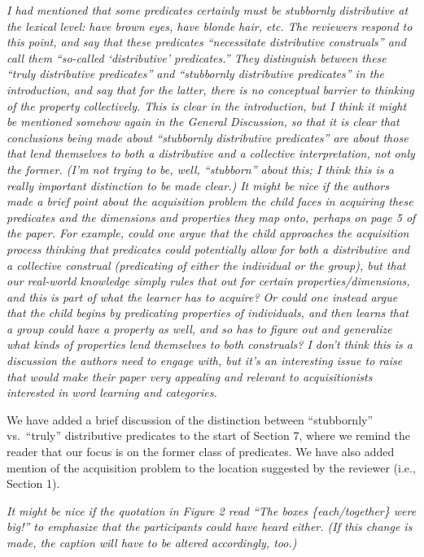 \documentclass[12pt]{article}
\begin{document}
\item \emph{I had mentioned that some predicates certainly must be stubbornly distributive at the lexical level: \emph{have brown eyes}, \emph{have blonde hair}, etc. The reviewers respond to this point, and say that these predicates ``necessitate distributive construals'' and call them ``so-called `distributive' predicates.'' They distinguish between these ``truly distributive predicates'' and ``stubbornly distributive predicates'' in the introduction, and say that for the latter, there is no conceptual barrier to thinking of the property collectively. This is clear in the introduction, but I think it might be mentioned somehow again in the General Discussion, so that it is clear that conclusions being made about ``stubbornly distributive predicates'' are about those that lend themselves to both a distributive and a collective interpretation, not only the former. (I'm not trying to be, well, ``stubborn'' about this; I think this is a really important distinction to be made clear.) It might be nice if the authors made a brief point about the acquisition problem the child faces in acquiring these predicates and the dimensions and properties they map onto, perhaps on page 5 of the paper. For example, could one argue that the child approaches the acquisition process thinking that predicates could potentially allow for both a distributive and a collective construal (predicating of either the individual or the group), but that our real-world knowledge simply rules that out for certain properties/dimensions, and this is part of what the learner has to acquire? Or could one instead argue that the child begins by predicating properties of individuals, and then learns that a group could have a property as well, and so has to figure out and generalize what kinds of properties lend themselves to both construals? I don't think this is a discussion the authors need to engage with, but it's an interesting issue to raise that would make their paper very appealing and relevant to acquisitionists interested in word learning and categories.}

We have added a brief discussion of the distinction between ``stubbornly'' vs.~``truly'' distributive predicates to the start of Section 7, where we remind the reader that our focus is on the former class of predicates. We have also added mention of the acquisition problem to the location suggested by the reviewer (i.e., Section 1).

\item \emph{It might be nice if the quotation in Figure 2 read ``The boxes \{each/together\} were big!'' to emphasize that the participants could have heard either. (If this change is made, the caption will have to be altered accordingly, too.)}
\end{document}
